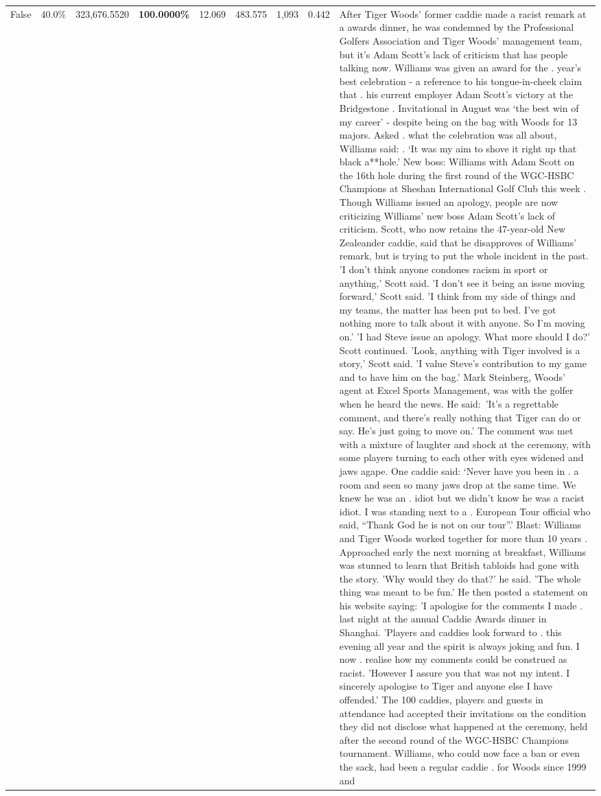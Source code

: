 \begin{table}[H]
\begin{tabular}{lllrlllll}
False & 40.0\% & 323,676.5520 & \bfseries \color{red} 100.0000\% & 12.069 & 483.575 & 1,093 & 0.442 & After Tiger Woods' former caddie made a racist remark at a awards dinner, he was condemned by the Professional Golfers Association and Tiger Woods' management team, but it's Adam Scott's lack of criticism that has people talking now. Williams was given an award for the . year’s best celebration - a reference to his tongue-in-cheek claim that . his current employer Adam Scott’s victory at the Bridgestone . Invitational in August was ‘the best win of my career’ - despite being on the bag with Woods for 13 majors. Asked . what the celebration was all about, Williams said: . ‘It was my aim to shove it right up that black a**hole.’ New boss: Williams with Adam Scott  on the 16th hole during the first round of the WGC-HSBC Champions at Sheshan International Golf Club this week . Though Williams issued an apology, people are now criticizing Williams' new boss Adam Scott's lack of criticism. Scott, who now retains the 47-year-old New Zealeander caddie, said that he disapproves of Williams' remark, but is trying to put the whole incident in the past. 'I don't think anyone condones racism in sport or anything,' Scott said. 'I don't see it being an issue moving forward,' Scott said. 'I think from my side of things and my teams, the matter has been put to bed. I've got nothing more to talk about it with anyone. So I'm moving on.' 'I had Steve issue an apology. What more should I do?' Scott continued. 'Look, anything with Tiger involved is a story,' Scott said. 'I value Steve's contribution to my game and to have him on the bag.' Mark Steinberg, Woods' agent at Excel Sports Management, was with the golfer when he heard the news. He said: 'It's a regrettable comment, and there's really nothing that Tiger can do or say. He's just going to move on.' The comment was met with a mixture of laughter and shock at the ceremony, with some players turning to each other with eyes widened and jaws agape. One caddie said: ‘Never have you been in . a room and seen so many jaws drop at the same time. We knew he was an . idiot but we didn’t know he was a racist idiot. I was standing next to a . European Tour official who said, “Thank God he is not on our tour”.’ Blast: Williams and Tiger Woods worked together for more than 10 years . Approached early the next morning at breakfast, Williams was stunned to learn that British tabloids had gone with the story. 'Why would they do that?' he said. 'The whole thing was meant to be fun.' He then posted a statement on his website saying: 'I apologise for the comments I made . last night at the annual Caddie Awards dinner in Shanghai. 'Players and caddies look forward to . this evening all year and the spirit is always joking and fun. I now . realise how my comments could be construed as racist. 'However I assure you that was not my intent. I sincerely apologise to Tiger and anyone else I have offended.' The 100 caddies, players and guests in attendance had accepted their invitations on the condition they did not disclose what happened at the ceremony, held after the second round of the WGC-HSBC Champions tournament. Williams, who could now face a ban or even the sack, had been a regular caddie . for Woods since 1999 and 
\end{tabular}
\end{table}
